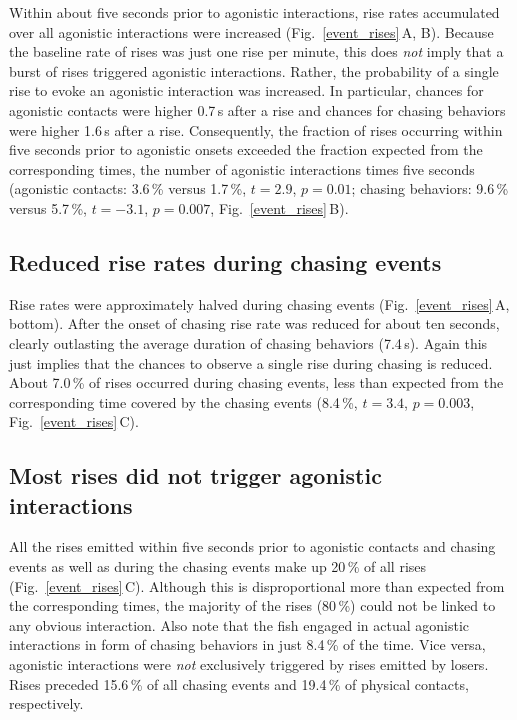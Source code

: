 \documentclass[vruler,JEB]{COB}%
\newcommand{\panel}[1]{\textsf{#1}}
\newcommand{\subfref}[2]{\textup{\ref{#1}}\,\panel{#2}}
\newcommand{\Fig}{Fig.}
\newcommand{\Subfigref}[2]{\Fig~\subfref{#1}{#2}}
\newcommand{\Figb}{Fig.}
\newcommand{\Subfigrefb}[2]{\Figb~\subfref{#1}{#2}}
\begin{document}
Within about five seconds prior to agonistic interactions, rise rates accumulated over all agonistic interactions were increased (\Subfigref{event_rises}{A, B}). Because the baseline rate of rises was just one rise per minute, this does \emph{not} imply that a burst of rises triggered agonistic interactions. Rather, the probability of a single rise to evoke an agonistic interaction was increased. In particular, chances for agonistic contacts were higher 0.7\,s after a rise and chances for chasing behaviors were higher 1.6\,s after a rise. Consequently, the fraction of rises occurring within five seconds prior to agonistic onsets exceeded the fraction expected from the corresponding times, the number of agonistic interactions times five seconds (agonistic contacts: 3.6\,\% versus 1.7\,\%, $t=2.9$, $p=0.01$; chasing behaviors: 9.6\,\% versus 5.7\,\%, $t=-3.1$, $p=0.007$, \Subfigrefb{event_rises}{B}).

\subsection{Reduced rise rates during chasing events}

Rise rates were approximately halved during chasing events (\Subfigrefb{event_rises}{A, bottom}). After the onset of chasing rise rate was reduced for about ten seconds, clearly outlasting the average duration of chasing behaviors (7.4\,s). Again this just implies that the chances to observe a single rise during chasing is reduced. About 7.0\,\% of rises occurred during chasing events, less than expected from the corresponding time covered by the chasing events (8.4\,\%, $t=3.4$, $p=0.003$, \Subfigrefb{event_rises}{C}).

\subsection{Most rises did not trigger agonistic interactions}

All the rises emitted within five seconds prior to agonistic contacts and chasing events as well as during the chasing events make up 20\,\% of all rises (\Subfigrefb{event_rises}{C}). Although this is disproportional more than expected from the corresponding times, the majority of the rises (80\,\%) could not be linked to any obvious interaction. Also note that the fish engaged in actual agonistic interactions in form of chasing behaviors in just 8.4\,\% of the time. Vice versa, agonistic interactions were \emph{not} exclusively triggered by rises emitted by losers. Rises preceded 15.6\,\% of all chasing events and 19.4\,\% of physical contacts, respectively. 
\end{document}
